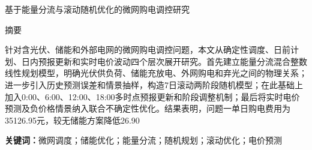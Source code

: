 \begin{center}{\heiti 基于能量分流与滚动随机优化的微网购电调控研究}\end{center}

\vspace{0.6em}
\begin{center}{\heiti 摘\quad 要}\end{center}
\vspace{0.4em}
{

针对含光伏、储能和外部电网的微网购电调控问题，本文从确定性调度、日前计划、日内预报更新和实时电价波动四个层次展开研究。首先建立能量分流混合整数线性规划模型，明确光伏供负荷、储能充放电、外网购电和弃光之间的物理关系；进一步引入历史预测误差和情景抽样，构造7日滚动两阶段随机模型；在此基础上加入0:00、6:00、12:00、18:00多时点预报更新和阶段调整机制；最后将实时电价预测及负价格情景纳入联合不确定性优化。结果表明，问题一单日购电费用为35126.95元，较无储能方案降低26.90%

\noindent\textbf{关键词：}微网调度；储能优化；能量分流；随机规划；滚动优化；电价预测
}

\newpage
